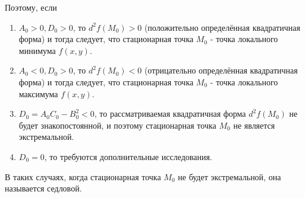     Поэтому, если
	\begin{enumerate}
		\item $A_0 > 0, D_0 > 0$, то $d^2 f(M_0) > 0$ (положительно определённая квадратичная форма) и тогда следует, что стационарная точка $M_0$ - точка локального минимума $f(x,y)$.
		\item $A_0 < 0, D_0 > 0$, то $d^2 f(M_0) < 0$ (отрицательно определённая квадратичная форма) и тогда следует, что стационарная точка $M_0$ - точка локального максимума $f(x,y)$.
		\item $D_0 = A_0 C_0 - B_0^2 < 0$, то  рассматриваемая квадратичная форма $d^2 f(M_0)$ не будет знакопостоянной, и поэтому стационарная точка $M_0$ не является экстремальной.
		\item $D_0 = 0$, то требуются дополнительные исследования.
    \end{enumerate}
        
         В таких случаях, когда стационарная точка $M_0$ не будет экстремальной, она называется седловой.
\newpage

